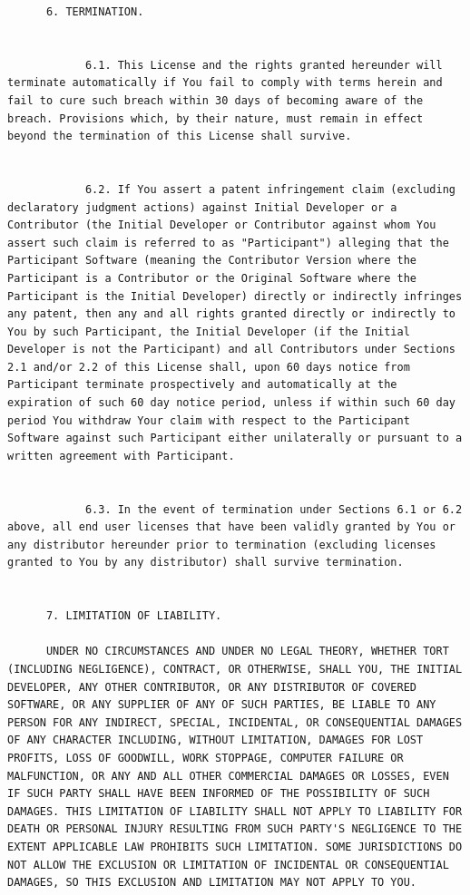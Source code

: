 \documentclass[10pt, headsepline,DIV14,BCOR0.5cm]{scrreprt}
\begin{document}
\begin{lstlisting}
      6. TERMINATION.
            

            6.1. This License and the rights granted hereunder will terminate automatically if You fail to comply with terms herein and fail to cure such breach within 30 days of becoming aware of the breach. Provisions which, by their nature, must remain in effect beyond the termination of this License shall survive.
            

            6.2. If You assert a patent infringement claim (excluding declaratory judgment actions) against Initial Developer or a Contributor (the Initial Developer or Contributor against whom You assert such claim is referred to as "Participant") alleging that the Participant Software (meaning the Contributor Version where the Participant is a Contributor or the Original Software where the Participant is the Initial Developer) directly or indirectly infringes any patent, then any and all rights granted directly or indirectly to You by such Participant, the Initial Developer (if the Initial Developer is not the Participant) and all Contributors under Sections 2.1 and/or 2.2 of this License shall, upon 60 days notice from Participant terminate prospectively and automatically at the expiration of such 60 day notice period, unless if within such 60 day period You withdraw Your claim with respect to the Participant Software against such Participant either unilaterally or pursuant to a written agreement with Participant.
            

            6.3. In the event of termination under Sections 6.1 or 6.2 above, all end user licenses that have been validly granted by You or any distributor hereunder prior to termination (excluding licenses granted to You by any distributor) shall survive termination.
    

      7. LIMITATION OF LIABILITY.

      UNDER NO CIRCUMSTANCES AND UNDER NO LEGAL THEORY, WHETHER TORT (INCLUDING NEGLIGENCE), CONTRACT, OR OTHERWISE, SHALL YOU, THE INITIAL DEVELOPER, ANY OTHER CONTRIBUTOR, OR ANY DISTRIBUTOR OF COVERED SOFTWARE, OR ANY SUPPLIER OF ANY OF SUCH PARTIES, BE LIABLE TO ANY PERSON FOR ANY INDIRECT, SPECIAL, INCIDENTAL, OR CONSEQUENTIAL DAMAGES OF ANY CHARACTER INCLUDING, WITHOUT LIMITATION, DAMAGES FOR LOST PROFITS, LOSS OF GOODWILL, WORK STOPPAGE, COMPUTER FAILURE OR MALFUNCTION, OR ANY AND ALL OTHER COMMERCIAL DAMAGES OR LOSSES, EVEN IF SUCH PARTY SHALL HAVE BEEN INFORMED OF THE POSSIBILITY OF SUCH DAMAGES. THIS LIMITATION OF LIABILITY SHALL NOT APPLY TO LIABILITY FOR DEATH OR PERSONAL INJURY RESULTING FROM SUCH PARTY'S NEGLIGENCE TO THE EXTENT APPLICABLE LAW PROHIBITS SUCH LIMITATION. SOME JURISDICTIONS DO NOT ALLOW THE EXCLUSION OR LIMITATION OF INCIDENTAL OR CONSEQUENTIAL DAMAGES, SO THIS EXCLUSION AND LIMITATION MAY NOT APPLY TO YOU.
    


\end{lstlisting}
\end{document}
